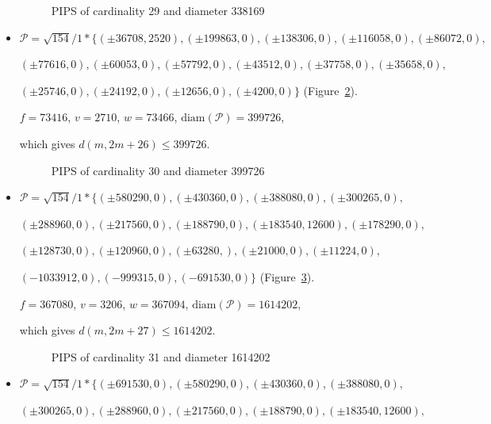 \documentclass[12pt]{article}
\theoremstyle{theorem}
\theoremstyle{dfn}
\theoremstyle{remark}
\begin{document}
\begin{itemize}
\begin{figure}[h!]
\parbox{1\linewidth}{\caption{PIPS of cardinality 29 and diameter 338169}
\label{picture_25.png}}
\end{figure}


\item
$\mathcal{P}=\sqrt{154}/{1} * \{ (\pm 36708, 2520),
(\pm 199863 , 0),
(\pm 138306 , 0),
(\pm 116058 , 0),
(\pm 86072 , 0),
$

$
(\pm 77616 , 0),
(\pm 60053 , 0),
(\pm 57792 , 0),
(\pm 43512 , 0),
(\pm 37758 , 0),
(\pm 35658 , 0),
$

$
(\pm 25746 , 0),
(\pm 24192 , 0),
(\pm 12656 , 0),
(\pm 4200 , 0)\}
$
(Figure~\ref{picture_26.png}).

$f = 73416$, $v = 2710$, $w = 73466$, $\operatorname{diam(\mathcal{P})} = 399726$,

which gives $d(m, 2m + 26) \leq 399726$.


\begin{figure}[h!]
\parbox{1\linewidth}{\caption{PIPS of cardinality 30 and diameter 399726}
\label{picture_26.png}}
\end{figure}


\item
$\mathcal{P}=\sqrt{154}/{1} * \{ (\pm 580290, 0),
(\pm 430360, 0),
(\pm 388080, 0),
(\pm 300265, 0),
$

$
(\pm 288960, 0),
(\pm 217560, 0),
(\pm 188790, 0),
(\pm 183540, 12600),
(\pm 178290, 0),
$

$
(\pm 128730, 0),
(\pm 120960, 0),
(\pm 63280, ),
(\pm 21000, 0),
(\pm 11224, 0),
$

$
(-1033912, 0),
(-999315, 0),
(-691530  , 0)\}
$
(Figure~\ref{picture_31.png}).

$f = 367080$, $v = 3206$, $w = 367094$, $\operatorname{diam(\mathcal{P})} = 1614202$,

which gives $d(m, 2m + 27) \leq 1614202$.


\begin{figure}[h!]
\parbox{1\linewidth}{\caption{PIPS of cardinality 31 and diameter 1614202}
\label{picture_31.png}}
\end{figure}


\item
$\mathcal{P}=\sqrt{154}/{1} * \{ (\pm 691530, 0),
(\pm 580290, 0),
(\pm 430360, 0),
(\pm 388080, 0),
$

$
(\pm 300265, 0),
(\pm 288960, 0),
(\pm 217560, 0),
(\pm 188790, 0),
(\pm 183540, 12600),
$


\end{itemize}
\end{document}
